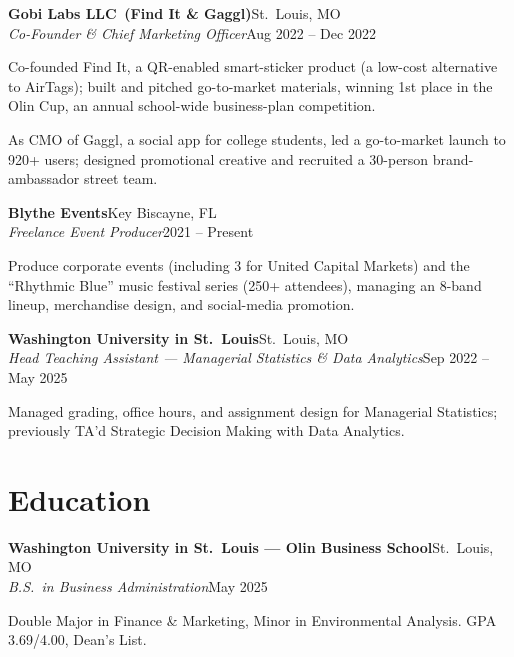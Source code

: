 \documentclass[letterpaper,10pt]{article}
\newcommand{\entry}[4]{%
  \textbf{#1}\hfill {#2}\\[1pt]
  \textit{#3}\hfill {#4}\par
}
\begin{document}
\vspace{2pt}
\entry{Gobi Labs LLC \,(Find It \& Gaggl)}{St.\ Louis, MO}{Co-Founder \& Chief Marketing Officer}{Aug 2022 -- Dec 2022}
\begin{points}
  \item Co-founded Find It, a QR-enabled smart-sticker product (a low-cost alternative to AirTags); built and pitched go-to-market materials, winning 1st place in the Olin Cup, an annual school-wide business-plan competition.
  \item As CMO of Gaggl, a social app for college students, led a go-to-market launch to 920+ users; designed promotional creative and recruited a 30-person brand-ambassador street team.
\end{points}

\vspace{2pt}
\entry{Blythe Events}{Key Biscayne, FL}{Freelance Event Producer}{2021 -- Present}
\begin{points}
  \item Produce corporate events (including 3 for United Capital Markets) and the ``Rhythmic Blue'' music festival series (250+ attendees), managing an 8-band lineup, merchandise design, and social-media promotion.
\end{points}

\vspace{2pt}
\entry{Washington University in St.\ Louis}{St.\ Louis, MO}{Head Teaching Assistant --- Managerial Statistics \& Data Analytics}{Sep 2022 -- May 2025}
\begin{points}
  \item Managed grading, office hours, and assignment design for Managerial Statistics; previously TA'd Strategic Decision Making with Data Analytics.
\end{points}

\section{Education}
\entry{Washington University in St.\ Louis --- Olin Business School}{St.\ Louis, MO}{B.S.\ in Business Administration}{May 2025}
\vspace{2pt}
Double Major in Finance \& Marketing, Minor in Environmental Analysis. \quad GPA 3.69/4.00, Dean's List.

\end{document}
